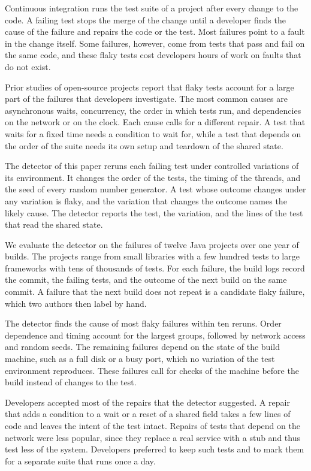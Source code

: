 Continuous integration runs the test suite of a project after every change to the code. A failing test stops the
merge of the change until a developer finds the cause of the failure and repairs the code or the test. Most
failures point to a fault in the change itself. Some failures, however, come from tests that pass and fail on the
same code, and these flaky tests cost developers hours of work on faults that do not exist.

Prior studies of open-source projects report that flaky tests account for a large part of the failures that
developers investigate. The most common causes are asynchronous waits, concurrency, the order in which tests run,
and dependencies on the network or on the clock. Each cause calls for a different repair. A test that waits for a
fixed time needs a condition to wait for, while a test that depends on the order of the suite needs its own setup
and teardown of the shared state.

The detector of this paper reruns each failing test under controlled variations of its environment. It changes the
order of the tests, the timing of the threads, and the seed of every random number generator. A test whose outcome
changes under any variation is flaky, and the variation that changes the outcome names the likely cause. The
detector reports the test, the variation, and the lines of the test that read the shared state.

We evaluate the detector on the failures of twelve Java projects over one year of builds. The projects range from
small libraries with a few hundred tests to large frameworks with tens of thousands of tests. For each failure, the
build logs record the commit, the failing tests, and the outcome of the next build on the same commit. A failure
that the next build does not repeat is a candidate flaky failure, which two authors then label by hand.

The detector finds the cause of most flaky failures within ten reruns. Order dependence and timing account for the
largest groups, followed by network access and random seeds. The remaining failures depend on the state of the build
machine, such as a full disk or a busy port, which no variation of the test environment reproduces. These failures
call for checks of the machine before the build instead of changes to the test.

Developers accepted most of the repairs that the detector suggested. A repair that adds a condition to a wait or a
reset of a shared field takes a few lines of code and leaves the intent of the test intact. Repairs of tests that
depend on the network were less popular, since they replace a real service with a stub and thus test less of the
system. Developers preferred to keep such tests and to mark them for a separate suite that runs once a day.

